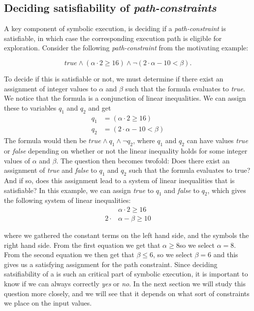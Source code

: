 	\subsection{Deciding satisfiability of \emph{path-constraints}}
	A key component of symbolic execution, is deciding if a \emph{path-constraint} is satisfiable, in which case the corresponding execution path is eligible for exploration. Consider the following \emph{path-constraint} from the motivating example:
	
	\begin{equation*}	
		true \land (\alpha \cdot 2 \geq 16) \land \neg (2\cdot \alpha - 10 < \beta).
	\end{equation*}
	
	To decide if this is satisfiable or not, we must determine if there exist an assignment of integer values to $\alpha$ and $\beta$ such that the formula evaluates to \emph{true}. We notice that the formula is a conjunction of linear inequalities. We can assign these to variables $q_1$ and $q_2$ and get
	\begin{align*}
		q_1 & = (\alpha \cdot 2 \geq 16) \\
		q_2 & = (2\cdot \alpha - 10 < \beta)
	\end{align*}
	The formula would then be $true\land q_1 \land \neg q_2$,
	where $q_1$ and $q_2$ can have values \emph{true} or \emph{false} depending on whether or not the linear inequality holds for some integer values of $\alpha$ and $\beta$. The question then becomes twofold: Does there exist an assignment of \emph{true} and \emph{false} to $q_1$ and $q_2$ such that the formula evaluates to true? And if so, does this assignment lead to a system of linear inequalities that is satisfiable?
	In this example, we can assign \emph{true} to $q_1$ and \emph{false} to $q_2$, which gives the following system of linear inequalities:
	\begin{align*}
		& \alpha \cdot 2 \geq 16 \\
		2  \cdot & \alpha - \beta \geq 10 
	\end{align*}
	
	where we gathered the constant terms on the left hand side, and the symbols the right hand side. From the first equation we get that $\alpha \geq 8$so we select $\alpha = 8$. From the second equation we then get that $\beta \leq 6$, so we select $\beta = 6$ and this gives us a satisfying assignment for the path constraint. Since deciding satsifiability of a \pc is such an critical part of symbolic execution, it is important to know if we can always correctly \emph{yes} or \emph{no}. In the next section we will study this question more closely, and we will see that it depends on what sort of constraints we place on the input values. 
